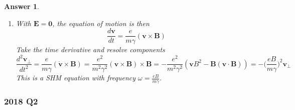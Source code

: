 \documentclass[a4paper]{article}
\newtheorem{ans}{Answer}[section]
\theoremstyle{new}
\begin{document}
\begin{ans}
\begin{enumerate}[label=(\alph*)]
where $|\mathbf{v}|^2=c^2(1-\gamma^{-2})$. Since $\gamma\neq1$, we must have $\frac{d\gamma}{dt}=0$, i.e. $\gamma$ and in turn $v$ are both constants. 
\item With $\mathbf{E}=\boldsymbol{0}$, the equation of motion is then
$$\frac{d\mathbf{v}}{dt}=\frac{e}{m\gamma}(\mathbf{v}\times\mathbf{B})$$
Take the time derivative and resolve components
$$\frac{d^2\mathbf{v_\perp}}{dt^2}=\frac{e}{m\gamma}(\mathbf{\dot{v}}\times\mathbf{B})=\frac{e^2}{m^2\gamma^2}(\mathbf{v}\times\mathbf{B})\times\mathbf{B}=-\frac{e^2}{m^2\gamma^2}(\mathbf{v}B^2-\mathbf{B}(\mathbf{v}\cdot\mathbf{B}))=-\bigg(\frac{eB}{m\gamma}\bigg)^2\mathbf{v_\perp}$$
This is a SHM equation with frequency $\omega=\frac{eB}{m\gamma}$.
\end{enumerate}
\end{ans}
\newpage
\subsubsection*{2018 Q2}
\end{document}
